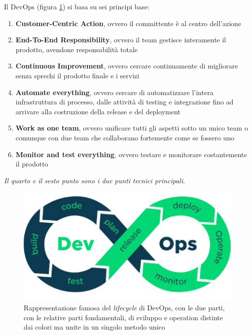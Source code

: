 \documentclass[a4paper,12pt, oneside]{book}
\begin{document}
Il DevOps (figura \ref{devops}) si basa su sei principi base:
\begin{enumerate}
  \item \textbf{Customer-Centric Action}, ovvero il committente è al centro
  dell'azione 
  \item \textbf{End-To-End Responsibility}, ovvero il team gestisce interamente
  il prodotto, avendone responsabilità totale
  \item \textbf{Continuous Improvement}, ovvero cercare continuamente di
  migliorare senza sprechi il prodotto finale e i servizi
  \item \textbf{Automate everything}, ovvero cercare di automatizzare l'intera
  infrastruttura di processo, dalle attività di testing e integrazione fino ad
  arrivare alla costruzione della release e del deployment
  \item \textbf{Work as one team}, ovvero unificare tutti gli aspetti sotto un
  unico team o comunque con due team che collaborano fortemente come se fossero
  uno 
  \item \textbf{Monitor and test everything}, ovvero testare e monitorare
  costantemente il prodotto
\end{enumerate}
\textit{Il quarto e il sesto punto sono i due punti tecnici principali}.
\begin{figure}
  \centering
  \includegraphics[scale = 0.6]{img/devops.jpg}
  \caption{Rappresentazione famosa del \textit{lifecycle} di DevOps, con le due
    parti, con le relative parti fondamentali, di sviluppo e operation distinte
    dai colori ma unite in un singolo metodo unico}
  \label{devops}
\end{figure}
\end{document}
